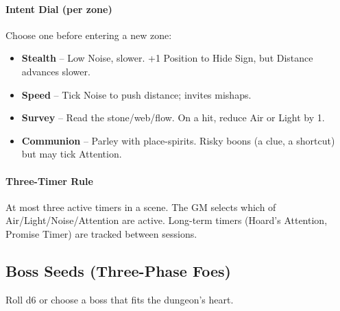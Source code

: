 \paragraph{Intent Dial (per zone)}
Choose one before entering a new zone:
\begin{itemize}
    \item \textbf{Stealth} -- Low Noise, slower. +1 Position to Hide Sign, but Distance advances slower.
    \item \textbf{Speed} -- Tick Noise to push distance; invites mishaps.
    \item \textbf{Survey} -- Read the stone/web/flow. On a hit, reduce Air or Light by 1.
    \item \textbf{Communion} -- Parley with place-spirits. Risky boons (a clue, a shortcut) but may tick Attention.
\end{itemize}

\paragraph{Three-Timer Rule}
At most three active timers in a scene. The GM selects which of Air/Light/Noise/Attention are active. Long-term timers (Hoard's Attention, Promise Timer) are tracked between sessions.

\subsection*{Boss Seeds (Three-Phase Foes)}
Roll d6 or choose a boss that fits the dungeon's heart.

